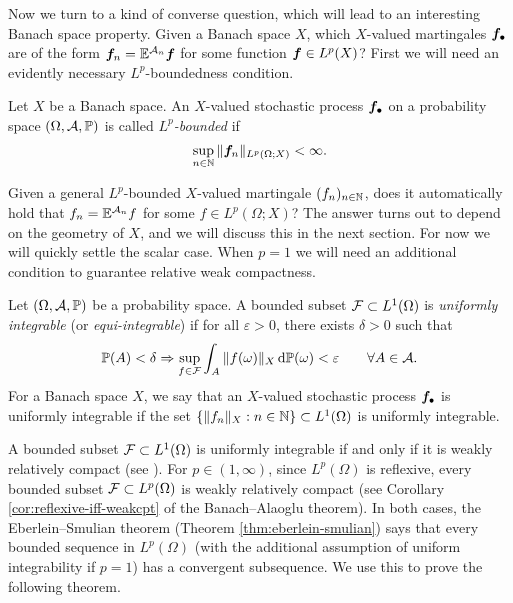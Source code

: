 Now we turn to a kind of converse question, which will lead to an interesting Banach space property.
Given a Banach space $X$, which $X$-valued martingales $\bm{f}_{\bullet}$ are of the form $\bm{f}_{n} = \mathbb{E}^{\mathcal{A}_{n}} \bm{f}$ for some function $\bm{f} \in L^p(X)$?
First we will need an evidently necessary $L^p$-boundedness condition.

\begin{defn}
  Let $X$ be a Banach space.
  An $X$-valued stochastic process $\bm{f}_{\bullet}$ on a probability space $(\Omega,\mathcal{A},\mathbb{P})$ is called \emph{$L^p$-bounded} if
  \begin{equation*}
    \sup_{n \in \mathbb{N}} \|\bm{f}_n\|_{L^p(\Omega;X)} < \infty.
  \end{equation*}
\end{defn}

Given a general $L^p$-bounded $X$-valued martingale $(f_n)_{n \in \mathbb{N}}$, does it automatically hold that $f_n = \mathbb{E}^{\mathcal{A}_n} f$ for some $f \in L^p(\Omega;X)$?
The answer turns out to depend on the geometry of $X$, and we will discuss this in the next section.
For now we will quickly settle the scalar case.
When $p=1$ we will need an additional condition to guarantee relative weak compactness.

\begin{defn}\label{defn:UI}
  Let $(\Omega,\mathcal{A},\mathbb{P})$ be a probability space.
  A bounded subset $\mathcal{F} \subset L^1(\Omega)$ is \emph{uniformly integrable} (or \emph{equi-integrable}) if for all $\varepsilon > 0$, there exists $\delta > 0$ such that
  \begin{equation*}
    \mathbb{P}(A) < \delta \Rightarrow \sup_{f \in \mathcal{F}} \int_{A} \|f(\omega)\|_X \, \mathrm{d}\mathbb{P}(\omega) < \varepsilon \qquad \forall A \in \mathcal{A}.
  \end{equation*}
  For a Banach space $X$, we say that an $X$-valued stochastic process $\bm{f}_{\bullet}$ is uniformly integrable if the set $\{\|f_n\|_{X} : n \in \mathbb{N}\} \subset L^1(\Omega)$ is uniformly integrable. 
\end{defn}

A bounded subset $\mathcal{F} \subset L^1(\Omega)$ is uniformly integrable if and only if it is weakly relatively compact (see \cite[Theorem 5.2.9]{AK06}).
For $p \in (1,\infty)$, since $L^p(\Omega)$ is reflexive, every bounded subset $\mathcal{F} \subset L^p(\Omega)$ is weakly relatively compact (see Corollary \ref{cor:reflexive-iff-weakcpt} of the Banach--Alaoglu theorem).
In both cases, the Eberlein--Smulian theorem (Theorem \ref{thm:eberlein-smulian}) says that every bounded sequence in $L^p(\Omega)$ (with the additional assumption of uniform integrability if $p=1$) has a convergent subsequence.
We use this to prove the following theorem.

